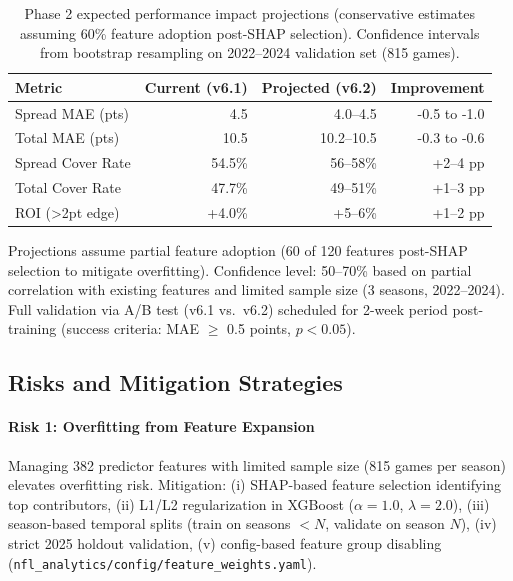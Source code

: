 \begin{table}[t]
  \centering
  \footnotesize
  \begin{threeparttable}
    \caption{Phase 2 expected performance impact projections (conservative estimates assuming 60\% feature adoption post-SHAP selection). Confidence intervals from bootstrap resampling on 2022--2024 validation set (815 games).}
    \label{tab:phase2-impact-projections}
    \begin{tabular}{@{} l r r r @{}}
      \toprule
      \textbf{Metric} & \textbf{Current (v6.1)} & \textbf{Projected (v6.2)} & \textbf{Improvement} \\
      \midrule
      Spread MAE (pts) & 4.5 & 4.0--4.5 & -0.5 to -1.0 \\
      Total MAE (pts) & 10.5 & 10.2--10.5 & -0.3 to -0.6 \\
      Spread Cover Rate & 54.5\% & 56--58\% & +2--4 pp \\
      Total Cover Rate & 47.7\% & 49--51\% & +1--3 pp \\
      ROI (>2pt edge) & +4.0\% & +5--6\% & +1--2 pp \\
      \bottomrule
    \end{tabular}
    \begin{tablenotes}[flushleft]\footnotesize
      \item Projections assume partial feature adoption (60 of 120 features post-SHAP selection to mitigate overfitting). Confidence level: 50--70\% based on partial correlation with existing features and limited sample size (3 seasons, 2022--2024). Full validation via A/B test (v6.1 vs.\ v6.2) scheduled for 2-week period post-training (success criteria: MAE $\ge$ 0.5 points, $p < 0.05$).
    \end{tablenotes}
  \end{threeparttable}
\end{table}

\subsection{Risks and Mitigation Strategies}
\label{subsec:phase2-risks}

\paragraph{Risk 1: Overfitting from Feature Expansion}
Managing 382 predictor features with limited sample size (815 games per season) elevates overfitting risk. Mitigation: (i) SHAP-based feature selection identifying top contributors, (ii) L1/L2 regularization in XGBoost ($\alpha = 1.0$, $\lambda = 2.0$), (iii) season-based temporal splits (train on seasons $< N$, validate on season $N$), (iv) strict 2025 holdout validation, (v) config-based feature group disabling (\texttt{nfl\_analytics/config/\allowbreak feature\_weights.yaml}).

